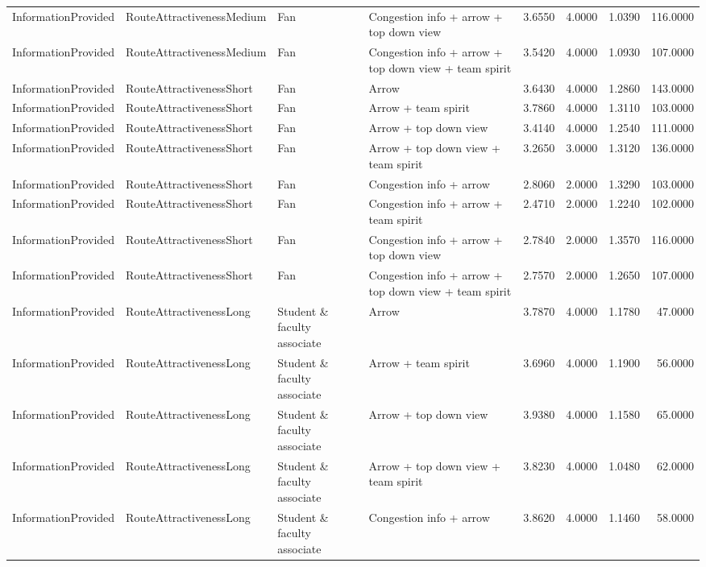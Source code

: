 \begin{tabular}{llllrrrr}
  InformationProvided & RouteAttractivenessMedium & Fan & Congestion info + arrow + top down view & 3.6550 & 4.0000 & 1.0390 & 116.0000 \\ 
  InformationProvided & RouteAttractivenessMedium & Fan & Congestion info + arrow + top down view + team spirit & 3.5420 & 4.0000 & 1.0930 & 107.0000 \\ 
  InformationProvided & RouteAttractivenessShort & Fan & Arrow & 3.6430 & 4.0000 & 1.2860 & 143.0000 \\ 
  InformationProvided & RouteAttractivenessShort & Fan & Arrow + team spirit & 3.7860 & 4.0000 & 1.3110 & 103.0000 \\ 
  InformationProvided & RouteAttractivenessShort & Fan & Arrow + top down view & 3.4140 & 4.0000 & 1.2540 & 111.0000 \\ 
  InformationProvided & RouteAttractivenessShort & Fan & Arrow + top down view + team spirit & 3.2650 & 3.0000 & 1.3120 & 136.0000 \\ 
  InformationProvided & RouteAttractivenessShort & Fan & Congestion info + arrow & 2.8060 & 2.0000 & 1.3290 & 103.0000 \\ 
  InformationProvided & RouteAttractivenessShort & Fan & Congestion info + arrow + team spirit & 2.4710 & 2.0000 & 1.2240 & 102.0000 \\ 
  InformationProvided & RouteAttractivenessShort & Fan & Congestion info + arrow + top down view & 2.7840 & 2.0000 & 1.3570 & 116.0000 \\ 
  InformationProvided & RouteAttractivenessShort & Fan & Congestion info + arrow + top down view + team spirit & 2.7570 & 2.0000 & 1.2650 & 107.0000 \\ 
  InformationProvided & RouteAttractivenessLong & Student \& faculty associate & Arrow & 3.7870 & 4.0000 & 1.1780 & 47.0000 \\ 
  InformationProvided & RouteAttractivenessLong & Student \& faculty associate & Arrow + team spirit & 3.6960 & 4.0000 & 1.1900 & 56.0000 \\ 
  InformationProvided & RouteAttractivenessLong & Student \& faculty associate & Arrow + top down view & 3.9380 & 4.0000 & 1.1580 & 65.0000 \\ 
  InformationProvided & RouteAttractivenessLong & Student \& faculty associate & Arrow + top down view + team spirit & 3.8230 & 4.0000 & 1.0480 & 62.0000 \\ 
  InformationProvided & RouteAttractivenessLong & Student \& faculty associate & Congestion info + arrow & 3.8620 & 4.0000 & 1.1460 & 58.0000 \\ 

\end{tabular}
